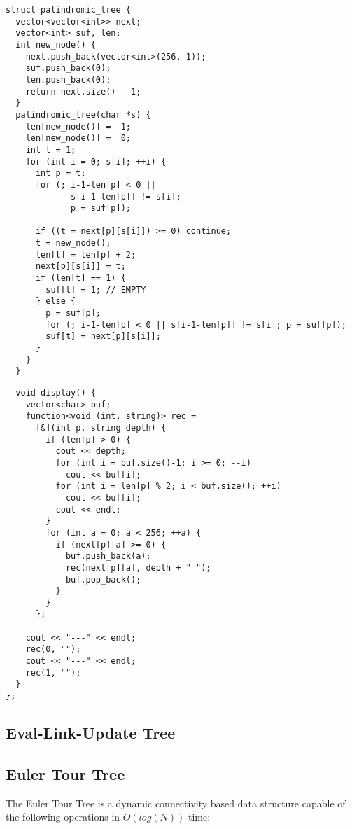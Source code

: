 \begin{center}
\begin{minipage}[t]{0.45\linewidth}
\begin{lstlisting}
struct palindromic_tree {
  vector<vector<int>> next;
  vector<int> suf, len;
  int new_node() {
    next.push_back(vector<int>(256,-1));
    suf.push_back(0);
    len.push_back(0);
    return next.size() - 1;
  }
  palindromic_tree(char *s) {
    len[new_node()] = -1;
    len[new_node()] =  0;
    int t = 1; 
    for (int i = 0; s[i]; ++i) {
      int p = t;
      for (; i-1-len[p] < 0 || 
             s[i-1-len[p]] != s[i];
             p = suf[p]);
      
      if ((t = next[p][s[i]]) >= 0) continue;
      t = new_node();
      len[t] = len[p] + 2;
      next[p][s[i]] = t;
      if (len[t] == 1) { 
        suf[t] = 1; // EMPTY
      } else {
        p = suf[p];
        for (; i-1-len[p] < 0 || s[i-1-len[p]] != s[i]; p = suf[p]);
        suf[t] = next[p][s[i]];
      }
    }
  }
\end{lstlisting}
\end{minipage}
\qquad
\begin{minipage}[t]{0.45\linewidth}
\begin{lstlisting}
  void display() {
    vector<char> buf;
    function<void (int, string)> rec =
      [&](int p, string depth) {
        if (len[p] > 0) {
          cout << depth;
          for (int i = buf.size()-1; i >= 0; --i)
            cout << buf[i];
          for (int i = len[p] % 2; i < buf.size(); ++i)
            cout << buf[i];
          cout << endl;
        }
        for (int a = 0; a < 256; ++a) {
          if (next[p][a] >= 0) {
            buf.push_back(a);
            rec(next[p][a], depth + " ");
            buf.pop_back();
          }
        }
      };
    
    cout << "---" << endl;
    rec(0, "");
    cout << "---" << endl;
    rec(1, "");
  }
};
\end{lstlisting}
\end{minipage}
\end{center}

\newpage

\subsection{Eval-Link-Update Tree}

\subsection{Euler Tour Tree}
The Euler Tour Tree is a dynamic connectivity based data structure \cite{Henzinger1998Nov} \cite{Miltersen1994Aug} capable of the following operations in $O(log(N))$ time:


